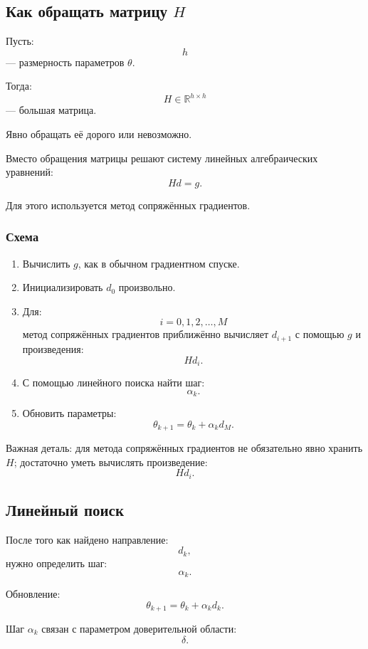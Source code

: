 \documentclass[12pt,a4paper]{article}
\begin{document}
\subsection{Как обращать матрицу $H$}

Пусть:
\[
h
\]
--- размерность параметров $\theta$.

Тогда:
\[
H\in\mathbb R^{h\times h}
\]
--- большая матрица.

Явно обращать её дорого или невозможно.

Вместо обращения матрицы решают систему линейных алгебраических уравнений:
\[
Hd=g.
\]

Для этого используется метод сопряжённых градиентов.

\subsubsection{Схема}

\begin{enumerate}
    \item Вычислить $g$, как в обычном градиентном спуске.

    \item Инициализировать $d_0$ произвольно.

    \item Для:
    \[
    i=0,1,2,\ldots,M
    \]
    метод сопряжённых градиентов приближённо вычисляет $d_{i+1}$ с помощью $g$ и произведения:
    \[
    H d_i.
    \]

    \item С помощью линейного поиска найти шаг:
    \[
    \alpha_k.
    \]

    \item Обновить параметры:
    \[
    \theta_{k+1}
    =
    \theta_k
    +
    \alpha_k d_M.
    \]
\end{enumerate}

Важная деталь: для метода сопряжённых градиентов не обязательно явно хранить $H$; достаточно уметь вычислять произведение:
\[
H d_i.
\]

\subsection{Линейный поиск}

После того как найдено направление:
\[
d_k,
\]
нужно определить шаг:
\[
\alpha_k.
\]

Обновление:
\[
\theta_{k+1}
=
\theta_k
+
\alpha_k d_k.
\]

Шаг $\alpha_k$ связан с параметром доверительной области:
\[
\delta.
\]
\end{document}
